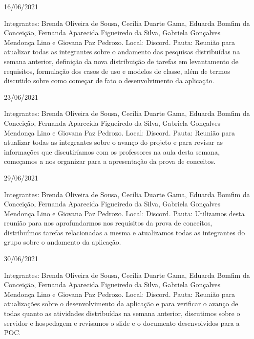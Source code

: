 \begin{apendicesenv}
\begin{flushleft}
16/06/2021

Integrantes: Brenda Oliveira de Sousa, Cecília Duarte Gama, Eduarda Bomfim da Conceição, Fernanda Aparecida Figueiredo da Silva, Gabriela Gonçalves Mendonça Lino e Giovana Paz Pedrozo.
\newline
Local: \gls{Discord}.
\newline
Pauta: Reunião para atualizar todas as integrantes sobre o andamento das pesquisas distribuídas na semana anterior, definição da nova distribuição de tarefas em levantamento de requisitos, formulação dos casos de uso e modelos de classe, além de termos discutido sobre como começar de fato o desenvolvimento da aplicação.

23/06/2021 

Integrantes: Brenda Oliveira de Sousa, Cecília Duarte Gama, Eduarda Bomfim da Conceição, Fernanda Aparecida Figueiredo da Silva, Gabriela Gonçalves Mendonça Lino e Giovana Paz Pedrozo.
\newline
Local: \gls{Discord}.
\newline
Pauta: Reunião para atualizar todas as integrantes sobre o avanço do projeto e para revisar as informações que discutiríamos com os professores na aula desta semana, começamos a nos organizar para a apresentação da prova de conceitos.

29/06/2021 

Integrantes: Brenda Oliveira de Sousa, Cecília Duarte Gama, Eduarda Bomfim da Conceição, Fernanda Aparecida Figueiredo da Silva, Gabriela Gonçalves Mendonça Lino e Giovana Paz Pedrozo.
\newline
Local: \gls{Discord}.
\newline
Pauta: Utilizamos desta reunião para nos aprofundarmos nos requisitos da prova de conceitos, distribuímos tarefas relacionadas a mesma e atualizamos todas as integrantes do grupo sobre o andamento da aplicação.

30/06/2021

Integrantes: Brenda Oliveira de Sousa, Cecília Duarte Gama, Eduarda Bomfim da Conceição, Fernanda Aparecida Figueiredo da Silva, Gabriela Gonçalves Mendonça Lino e Giovana Paz Pedrozo.
\newline
Local: \gls{Discord}.
\newline
Pauta: Reunião para atualizações sobre o desenvolvimento da aplicação e para verificar o avanço de todas quanto as atividades distribuídas na semana anterior, discutimos sobre o servidor e hospedagem e revisamos o slide e o documento desenvolvidos para a \ac{POC}.
\end{flushleft}


\end{apendicesenv}
